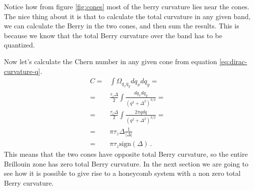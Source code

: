 Notice how from figure \ref{fig:cones} most of the berry curvature lies near the cones. The nice thing about it is that to calculate the total curvature in any given band, we can calculate the Berry in the two cones, and then sum the results. This is because we know that the total Berry curvature over the band has to be quantized.

Now let's calculate the Chern number in any given cone from equation \ref{eq:dirac-curvature-q}.
\begin{equation}
    \begin{split}
        C=&\int \Omega_{q_xq_y}dq_xdq_y=\\
        =&\frac{\tau_z\Delta}2\int\frac{dq_xdq_y}{(q^2+\Delta^2)^{3/2}}=\\
        =&\frac{\tau_z\Delta}2\int\frac{2\pi q dq}{(q^2+\Delta^2)^{3/2}}=\\
        =&\pi\tau_z\Delta \frac 1{|\Delta|}\\
        =&\pi\tau_z\textrm{sign}(\Delta)\,.
    \end{split}
    \label{eq:dirac-curvature-total}
\end{equation}
This means that the two cones have opposite total Berry curvature, so the entire Brillouin zone has zero total Berry curvature. In the next section we are going to see how it is possible to give rise to a honeycomb system with a non zero total Berry curvature.


